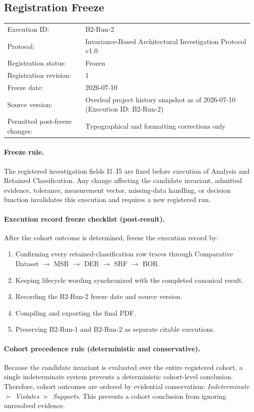 \subsection{Registration Freeze}
\label{sec:registration-freeze}
\begin{tabular}{@{}ll@{}}
\toprule
Execution ID: & B2-Run-2\\
Protocol: & Invariance-Based Architectural Investigation Protocol v1.0\\
Registration status: & Frozen\\
Registration revision: & 1\\
Freeze date: & 2026-07-10\\
Source version: & Overleaf project history snapshot as of 2026-07-10 (Execution ID: B2-Run-2)\\
Permitted post-freeze changes: & Typographical and formatting corrections only\\
\bottomrule
\end{tabular}

\paragraph{Freeze rule.}
The registered investigation fields I1--I5 are fixed before execution of
Analysis and Retained Classification. Any change affecting the candidate
invariant, admitted evidence, tolerance, measurement vector, missing-data
handling, or decision function invalidates this execution and requires a new
registered run.

\paragraph{Execution record freeze checklist (post-result).}
After the cohort outcome is determined, freeze the execution record by:
\begin{enumerate}
  \item Confirming every retained-classification row traces through Comparative Dataset $\rightarrow$ MSR $\rightarrow$ DER $\rightarrow$ SRF $\rightarrow$ BOR.
  \item Keeping lifecycle wording synchronized with the completed canonical result.
  \item Recording the B2-Run-2 freeze date and source version.
  \item Compiling and exporting the final PDF.
  \item Preserving B2-Run-1 and B2-Run-2 as separate citable executions.
\end{enumerate}

\paragraph{Cohort precedence rule (deterministic and conservative).}
Because the candidate invariant is evaluated over the entire registered cohort,
a single indeterminate system prevents a deterministic cohort-level conclusion.
Therefore, cohort outcomes are ordered by evidential conservatism:
\textit{Indeterminate} $\succ$ \textit{Violates} $\succ$ \textit{Supports}.
This prevents a cohort conclusion from ignoring unresolved evidence.
